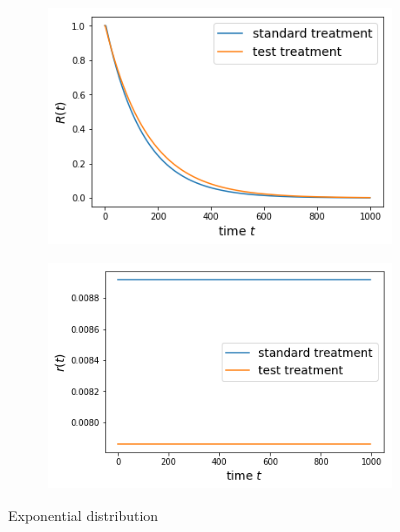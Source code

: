 \documentclass[10pt]{article}
\begin{document}
    \begin{figure}[htb!]
\centering
    \begin{subfigure}{.4\linewidth}
    \centering
    \includegraphics[width=.99\textwidth]{Images/treat/Sexp.png}
  \end{subfigure}%
    \begin{subfigure}{.4\linewidth}
    \centering
    \includegraphics[width=.99\textwidth]{Images/treat/rexp.png}
  \end{subfigure}%
  \caption{Exponential distribution}\label{fig:karexp} 
   \end{figure}   
\end{document}
